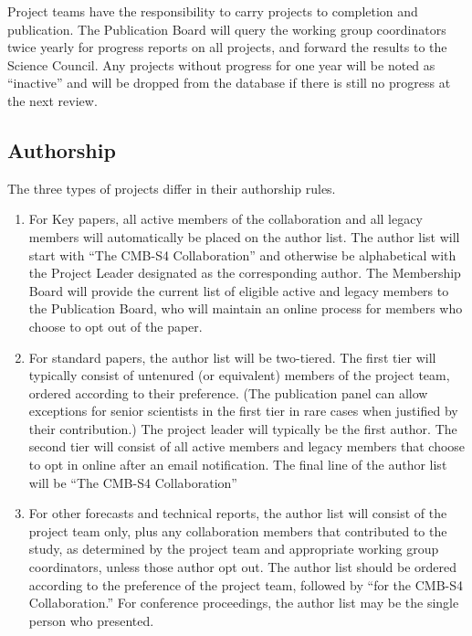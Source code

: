 Project teams have the responsibility to carry projects to completion and publication.  The Publication Board will query the working group coordinators twice yearly for progress reports on all projects, and forward the results to the Science Council.  Any projects without progress for one year will be noted as ``inactive'' and will be dropped from the database if there is still no progress at the next review.

\subsection{Authorship}

The three types of projects differ in their authorship rules.

\begin{enumerate}
\item For Key papers, all active members of the collaboration and all legacy members will automatically be placed on the author list.  The author list will start with ``The CMB-S4 Collaboration'' and otherwise be alphabetical with the Project Leader designated as the corresponding author.  The Membership Board will provide the current list of eligible active and legacy members to the Publication Board, who will maintain an online process for members who choose to opt out of the paper.
\item For standard papers, the author list will be two-tiered.  The first tier will typically consist of untenured (or equivalent) members of the project team, ordered according to their preference.  (The publication panel can allow exceptions for senior scientists in the first tier in rare cases when justified by their contribution.)  The project leader will typically be the first author.  The second tier will consist of all active members and legacy members that choose to opt in online after an email notification.  The final line of the author list will be ``The CMB-S4 Collaboration''
  \item For other forecasts and technical reports, the author list will consist of the project team only, plus any collaboration members that contributed to the study, as determined by the project team and appropriate working group coordinators, unless those author opt out.  The author list should be ordered according to the preference of the project team, followed by ``for the CMB-S4 Collaboration.''  For conference proceedings, the author list may be the single person who presented.
\end{enumerate}
    
